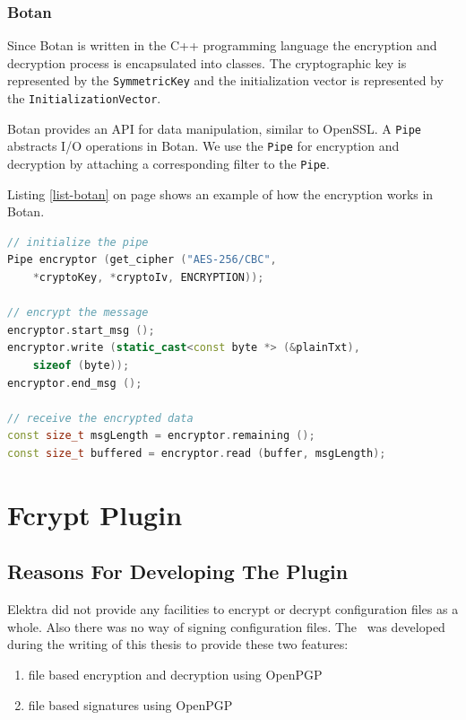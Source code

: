 \subsubsection{Botan}

Since Botan is written in the C++ programming language the encryption and decryption process is encapsulated into classes.
The cryptographic key is represented by the \texttt{SymmetricKey} and the initialization vector is represented by the \texttt{InitializationVector}.

Botan provides an API for data manipulation, similar to OpenSSL.
A \texttt{Pipe} abstracts I/O operations in Botan.
We use the \texttt{Pipe} for encryption and decryption by attaching a corresponding filter to the \texttt{Pipe}. 

Listing \ref{list-botan} on page \pageref{list-botan} shows an example of how the encryption works in Botan.

\begin{lstlisting}[label=list-botan,language=C++,caption={Encryption in the Botan crypto plugin variant}]
// initialize the pipe
Pipe encryptor (get_cipher ("AES-256/CBC", 
	*cryptoKey, *cryptoIv, ENCRYPTION));

// encrypt the message
encryptor.start_msg ();
encryptor.write (static_cast<const byte *> (&plainTxt), 
	sizeof (byte));
encryptor.end_msg ();

// receive the encrypted data
const size_t msgLength = encryptor.remaining ();
const size_t buffered = encryptor.read (buffer, msgLength);
\end{lstlisting}


\section{Fcrypt Plugin}
\label{fcrypt-plugin}

\subsection{Reasons For Developing The Plugin}

Elektra did not provide any facilities to encrypt or decrypt configuration files as a whole.
Also there was no way of signing configuration files.
The \fcrypt ~was developed during the writing of this thesis to provide these two features:
\begin{enumerate}
\item file based encryption and decryption using OpenPGP
\item file based signatures using OpenPGP
\end{enumerate}

